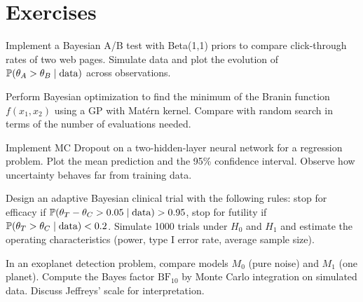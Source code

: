 \section{Exercises}

\begin{exercise}
Implement a Bayesian A/B test with Beta(1,1) priors to compare click-through
rates of two web pages. Simulate data and plot the evolution of
$\mathbb{P}(\theta_A > \theta_B \mid \text{data})$ across observations.
\end{exercise}

\begin{exercise}
Perform Bayesian optimization to find the minimum of the Branin function
$f(x_1, x_2)$ using a GP with Mat\'ern kernel. Compare with random search
in terms of the number of evaluations needed.
\end{exercise}

\begin{exercise}
Implement MC Dropout on a two-hidden-layer neural network for a regression
problem. Plot the mean prediction and the 95\% confidence interval. Observe
how uncertainty behaves far from training data.
\end{exercise}

\begin{exercise}
Design an adaptive Bayesian clinical trial with the following rules: stop
for efficacy if $\mathbb{P}(\theta_T - \theta_C > 0.05 \mid \text{data}) > 0.95$,
stop for futility if $\mathbb{P}(\theta_T > \theta_C \mid \text{data}) < 0.2$.
Simulate 1000 trials under $H_0$ and $H_1$ and estimate the operating
characteristics (power, type I error rate, average sample size).
\end{exercise}

\begin{exercise}
In an exoplanet detection problem, compare models $M_0$ (pure noise) and
$M_1$ (one planet). Compute the Bayes factor $\mathrm{BF}_{10}$ by Monte
Carlo integration on simulated data. Discuss Jeffreys' scale for
interpretation.
\end{exercise}
